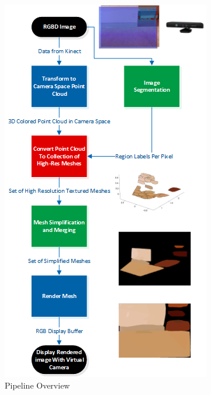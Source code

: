 \documentclass[letterpaper, 10 pt, conference]{ieeeconf}
\begin{document}
\begin{figure}[!ht]
    \centering
    \includegraphics[scale=1.0]{pipelineflowchart.png}
    \caption{Pipeline Overview}
    \label{fig:pipeline}
\end{figure}

\printbibliography
\end{document}
